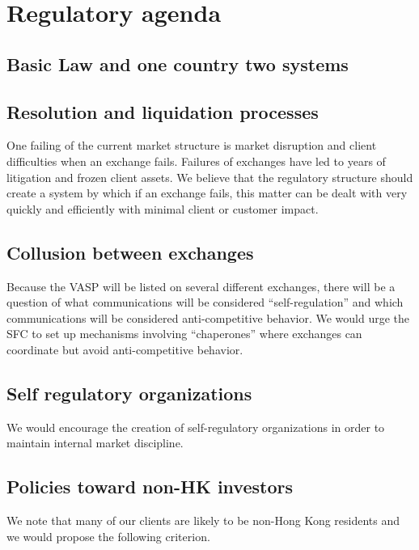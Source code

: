 \section{Regulatory agenda}

\subsection{Basic Law and one country two systems}


\subsection{Resolution and liquidation processes}

One failing of the current market structure is market disruption and
client difficulties when an exchange fails.  Failures of exchanges
have led to years of litigation and frozen client assets.  We believe
that the regulatory structure should create a system by which if an
exchange fails, this matter can be dealt with very quickly and
efficiently with minimal client or customer impact.

\subsection{Collusion between exchanges}

Because the VASP will be listed on several different exchanges, there
will be a question of what communications will be considered
``self-regulation'' and which communications will be considered
anti-competitive behavior.  We would urge the SFC to set up mechanisms
involving ``chaperones'' where exchanges can coordinate but avoid
anti-competitive behavior.

\subsection{Self regulatory organizations}
We would encourage the creation of self-regulatory organizations in
order to maintain internal market discipline.  

\subsection{Policies toward non-HK investors}

We note that many of our clients are likely to be non-Hong Kong
residents and we would propose the following criterion.


